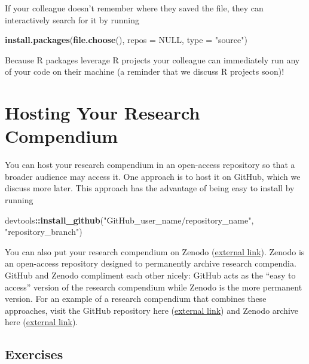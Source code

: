 \documentclass[
]{book}
\newenvironment{Shaded}{\begin{snugshade}}{\end{snugshade}}
\newcommand{\DataTypeTok}[1]{\textcolor[rgb]{0.13,0.29,0.53}{#1}}
\newcommand{\KeywordTok}[1]{\textcolor[rgb]{0.13,0.29,0.53}{\textbf{#1}}}
\newcommand{\NormalTok}[1]{#1}
\newcommand{\OperatorTok}[1]{\textcolor[rgb]{0.81,0.36,0.00}{\textbf{#1}}}
\newcommand{\OtherTok}[1]{\textcolor[rgb]{0.56,0.35,0.01}{#1}}
\newcommand{\StringTok}[1]{\textcolor[rgb]{0.31,0.60,0.02}{#1}}
\begin{document}
If your colleague doesn't remember where they saved the file, they can interactively search for it by running

\begin{Shaded}
\begin{Highlighting}[]
\KeywordTok{install.packages}\NormalTok{(}\KeywordTok{file.choose}\NormalTok{(), }\DataTypeTok{repos =} \OtherTok{NULL}\NormalTok{, }\DataTypeTok{type =} \StringTok{"source"}\NormalTok{)}
\end{Highlighting}
\end{Shaded}

Because R packages leverage R projects your colleague can immediately run any of your code on their machine (a reminder that we discuss R projects soon)!

\hypertarget{hosting-your-research-compendium}{%
\section{Hosting Your Research Compendium}\label{hosting-your-research-compendium}}

You can host your research compendium in an open-access repository so that a broader audience may access it. One approach is to host it on GitHub, which we discuss more later. This approach has the advantage of being easy to install by running

\begin{Shaded}
\begin{Highlighting}[]
\NormalTok{devtools}\OperatorTok{::}\KeywordTok{install_github}\NormalTok{(}\StringTok{"GitHub_user_name/repository_name"}\NormalTok{, }\StringTok{"repository_branch"}\NormalTok{)}
\end{Highlighting}
\end{Shaded}

You can also put your research compendium on Zenodo (\href{https://zenodo.org/}{external link}). Zenodo is an open-access repository designed to permanently archive research compendia. GitHub and Zenodo compliment each other nicely: GitHub acts as the ``easy to access'' version of the research compendium while Zenodo is the more permanent version. For an example of a research compendium that combines these approaches, visit the GitHub repository here (\href{https://github.com/usepa/ri_wq_trends}{external link}) and Zenodo archive here (\href{https://zenodo.org/record/4306765\#.YUygPbhKhPY}{external link}).

\hypertarget{ex-set10}{%
\subsection{Exercises}\label{ex-set10}}
\end{document}
